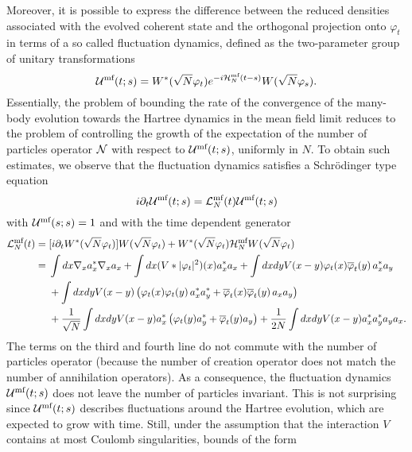 \documentclass[11pt,a4paper]{article}
\newcommand{\cU}{{\cal U}}
\newcommand{\cH}{{\cal H}}
\newcommand{\cL}{{\cal L}}
\newcommand{\cN}{{\cal N}}
\begin{document}
Moreover, it is possible to express the difference between the reduced densities associated with the evolved coherent state and the orthogonal projection onto $\varphi_t$ in terms of a so called fluctuation dynamics, defined as the two-parameter group of unitary transformations
\begin{equation}\label{eq:cU-mf} \cU^{\text{mf}} (t;s) = W^* (\sqrt{N}
\varphi_t) e^{-i \cH^{\text{mf}}_N (t-s)} W(\sqrt{N} \varphi_s). \end{equation}
Essentially, the problem of bounding the rate of the convergence of the
many-body evolution towards the Hartree dynamics in the mean field limit
reduces to the problem of controlling the growth of the expectation of the
number of particles operator $\cN$ with respect to $\cU^{\text{mf}} (t;s)$,
uniformly in $N$. To obtain such estimates, we observe that the fluctuation dynamics satisfies a Schr\"odinger type equation
\[ i\partial_t \cU^{\text{mf}} (t;s) = \cL^{\text{mf}}_N (t) \cU^{\text{mf}} (t;s) \]
with $\cU^{\text{mf}} (s;s) = 1$ and with the time dependent generator
\begin{equation}\label{eq:cL-mf} \begin{split} 
\cL^{\text{mf}}_N (t) = \; & [i\partial_t W^* (\sqrt{N} \varphi_t)] W(\sqrt{N} \varphi_t) + W^* (\sqrt{N} \varphi_t) \cH^{\text{mf}}_N W(\sqrt{N} \varphi_t) \\  = \; &\int dx \nabla_x a_x^* \nabla_x a_x + \int dx ( V*|\varphi_t|^2) (x) a_x^* a_x + \int dx dy V(x-y) \varphi_t (x) \overline{\varphi}_t (y) \, a_x^* a_y \\ &+  \int dx dy V(x-y)  \left(\varphi_t (x) \varphi_t (y) \, a_x^* a^*_y + \overline{\varphi}_t (x) \overline{\varphi}_t (y) \, a_x a_y \right) \\
&+\frac{1}{\sqrt{N}} \int dx dy V(x-y) a_x^* \left( \varphi_t (y) a_y^* +
\overline{\varphi}_t (y) a_y \right) + \frac{1}{2N} \int dx dy V(x-y) a_x^*
a_y^* a_y a_x. \end{split} \end{equation}
The terms on the third and fourth line do not commute with the number of particles operator (because the number of creation operator does not match the number of annihilation operators). As a consequence, the fluctuation dynamics $\cU^{\text{mf}} (t;s)$ does not leave the number of particles invariant. This is not surprising since $\cU^{\text{mf}} (t;s)$ describes fluctuations around the Hartree evolution, which are expected to grow with time. Still, under the assumption that the interaction $V$ contains at most Coulomb singularities, bounds of the form
\end{document}
